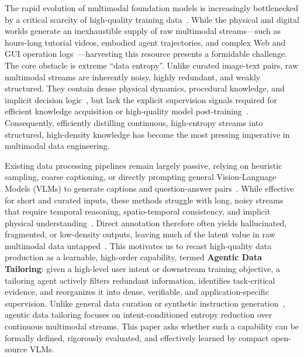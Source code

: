 \documentclass{llmxive}
\begin{document}
The rapid evolution of multimodal foundation models is increasingly bottlenecked by a critical scarcity of high-quality training data~\cite{qwen2.5vl, qwen3vl,llava,gpt4o,gpt4,gemini,gemini2.5,gpt5,claude,minimax,wan2025,seedance2}. While the physical and digital worlds generate an inexhaustible supply of raw multimodal streams—such as hours-long tutorial videos, embodied agent trajectories, and complex Web and GUI operation logs~\cite{grauman2022ego4d,savva2019habitat,dai2017scannet,androidinthewild,androidworld,mind2web}—harvesting this resource presents a formidable challenge. The core obstacle is extreme ``data entropy''. Unlike curated image-text pairs, raw multimodal streams are inherently noisy, highly redundant, and weakly structured. They contain dense physical dynamics, procedural knowledge, and implicit decision logic~\cite{grauman2022ego4d,Ego-exo4d,miech2019howto100m,savva2019habitat,osworld,mind2web}, but lack the explicit supervision signals required for efficient knowledge acquisition or high-quality model post-training~\cite{textbooks,lima,sharegpt4v,llavaonevision}. Consequently, efficiently distilling continuous, high-entropy streams into structured, high-density knowledge has become the most pressing imperative in multimodal data engineering.

Existing data processing pipelines remain largely passive, relying on heuristic sampling, coarse captioning, or directly prompting general Vision-Language Models (VLMs) to generate captions and question-answer pairs~\cite{sharegpt4v,gao2024sphinx,chen2023minigptv2}. While effective for short and curated inputs, these methods struggle with long, noisy streams that require temporal reasoning, spatio-temporal consistency, and implicit physical understanding~\cite{vlm2bench,vsibench,mmsibench,disheng2024thinking,mico,li2025viewspatial}. Direct annotation therefore often yields hallucinated, fragmented, or low-density outputs, leaving much of the latent value in raw multimodal data untapped~\cite{hallusionbench,evaluating}. This motivates us to recast high-quality data production as a learnable, high-order capability, termed \textbf{Agentic Data Tailoring}: given a high-level user intent or downstream training objective, a tailoring agent actively filters redundant information, identifies task-critical evidence, and reorganizes it into dense, verifiable, and application-specific supervision. Unlike general data curation or synthetic instruction generation~\cite{data-centric-survey,dataperf,selfinstruct,wizardlm,orca,lima,alpagasus}, agentic data tailoring focuses on intent-conditioned entropy reduction over continuous multimodal streams. This paper asks whether such a capability can be formally defined, rigorously evaluated, and effectively learned by compact open-source VLMs.
\end{document}
